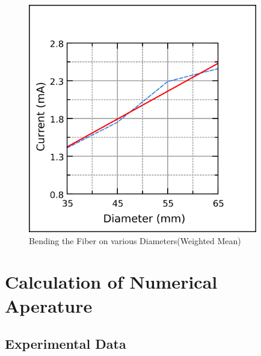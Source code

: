\begin{figure}
        \centering
        \includegraphics[width = 10cm]{images/BL_MEAN.png}
        \caption{Bending the Fiber on various Diameters(Weighted Mean)}
    \end{figure}
\pagebreak    
\section{Calculation of Numerical Aperature}
\subsection{Experimental Data}

